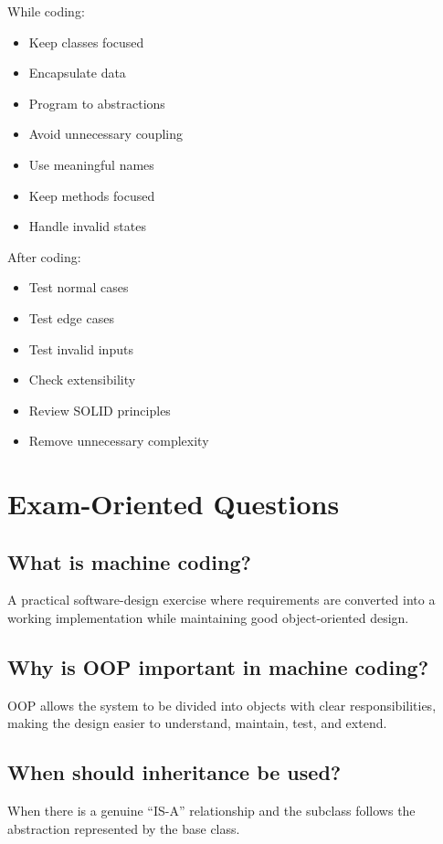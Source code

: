 \documentclass[12pt,a4paper]{article}
\begin{document}
While coding:

\begin{itemize}[label=$\square$]
\item Keep classes focused
\item Encapsulate data
\item Program to abstractions
\item Avoid unnecessary coupling
\item Use meaningful names
\item Keep methods focused
\item Handle invalid states
\end{itemize}

After coding:

\begin{itemize}[label=$\square$]
\item Test normal cases
\item Test edge cases
\item Test invalid inputs
\item Check extensibility
\item Review SOLID principles
\item Remove unnecessary complexity
\end{itemize}

\section{Exam-Oriented Questions}

\subsection*{What is machine coding?}
A practical software-design exercise where requirements are converted into a working implementation while maintaining good object-oriented design.

\subsection*{Why is OOP important in machine coding?}
OOP allows the system to be divided into objects with clear responsibilities, making the design easier to understand, maintain, test, and extend.

\subsection*{When should inheritance be used?}
When there is a genuine ``IS-A'' relationship and the subclass follows the abstraction represented by the base class.
\end{document}
